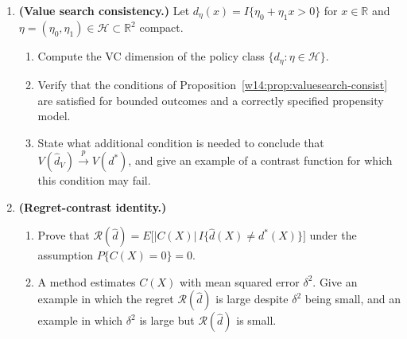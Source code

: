 \documentclass[master.tex]{subfiles}
\begin{document}
\begin{enumerate}
    \item \textbf{(Value search consistency.)}
    Let \(d_\eta(x)=I\{\eta_0+\eta_1 x>0\}\) for \(x\in\mathbb R\) and
    \(\eta=(\eta_0,\eta_1)\in\mathcal H\subset\mathbb R^2\) compact.
    \begin{enumerate}
        \item[(a)] Compute the VC dimension of the policy class
            \(\{d_\eta:\eta\in\mathcal H\}\).
        \item[(b)] Verify that the conditions of
            Proposition~\ref{w14:prop:valuesearch-consist} are satisfied for
            bounded outcomes and a correctly specified propensity model.
        \item[(c)] State what additional condition is needed to conclude that
            \(V(\hat d_V)\xrightarrow{p}V(d^\ast)\), and give an example of a
            contrast function for which this condition may fail.
    \end{enumerate}

    \item \textbf{(Regret-contrast identity.)}
    \begin{enumerate}
        \item[(a)] Prove that \(\mathcal R(\hat d)
            =E\bigl[|C(X)|\,I\{\hat d(X)\neq d^\ast(X)\}\bigr]\)
            under the assumption \(P\{C(X)=0\}=0\).
        \item[(b)] A method estimates \(C(X)\) with mean squared error
            \(\delta^2\). Give an example in which the regret
            \(\mathcal R(\hat d)\) is large despite \(\delta^2\) being small,
            and an example in which \(\delta^2\) is large but
            \(\mathcal R(\hat d)\) is small.
    \end{enumerate}


\end{enumerate}
\end{document}
